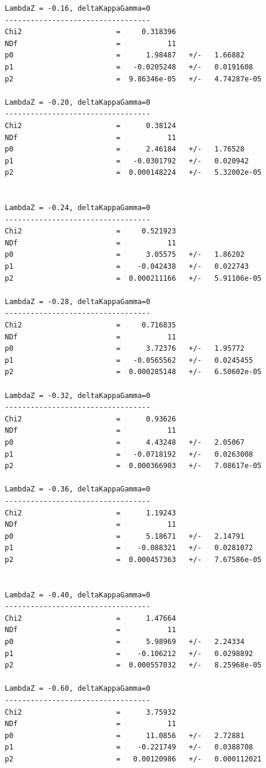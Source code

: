 \begin{verbatim}
LambdaZ = -0.16, deltaKappaGamma=0
----------------------------------
Chi2                      =     0.318396
NDf                       =           11
p0                        =      1.98487   +/-   1.66882     
p1                        =   -0.0205248   +/-   0.0191608   
p2                        =  9.86346e-05   +/-   4.74287e-05 

LambdaZ = -0.20, deltaKappaGamma=0
----------------------------------
Chi2                      =      0.38124
NDf                       =           11
p0                        =      2.46184   +/-   1.76528     
p1                        =   -0.0301792   +/-   0.020942    
p2                        =  0.000148224   +/-   5.32002e-05 


LambdaZ = -0.24, deltaKappaGamma=0
----------------------------------
Chi2                      =     0.521923
NDf                       =           11
p0                        =      3.05575   +/-   1.86202     
p1                        =    -0.042438   +/-   0.022743    
p2                        =  0.000211166   +/-   5.91106e-05 

LambdaZ = -0.28, deltaKappaGamma=0
----------------------------------
Chi2                      =     0.716835
NDf                       =           11
p0                        =      3.72376   +/-   1.95772     
p1                        =   -0.0565562   +/-   0.0245455   
p2                        =  0.000285148   +/-   6.50602e-05 

LambdaZ = -0.32, deltaKappaGamma=0
----------------------------------
Chi2                      =      0.93626
NDf                       =           11
p0                        =      4.43248   +/-   2.05067     
p1                        =   -0.0718192   +/-   0.0263008   
p2                        =  0.000366903   +/-   7.08617e-05 

LambdaZ = -0.36, deltaKappaGamma=0
----------------------------------
Chi2                      =      1.19243
NDf                       =           11
p0                        =      5.18671   +/-   2.14791     
p1                        =    -0.088321   +/-   0.0281072   
p2                        =  0.000457363   +/-   7.67586e-05 


LambdaZ = -0.40, deltaKappaGamma=0
----------------------------------
Chi2                      =      1.47664
NDf                       =           11
p0                        =      5.98969   +/-   2.24334     
p1                        =    -0.106212   +/-   0.0298892   
p2                        =  0.000557032   +/-   8.25968e-05 

LambdaZ = -0.60, deltaKappaGamma=0
----------------------------------
Chi2                      =      3.75932
NDf                       =           11
p0                        =      11.0856   +/-   2.72881     
p1                        =    -0.221749   +/-   0.0388708   
p2                        =   0.00120986   +/-   0.000112021 
\end{verbatim}


